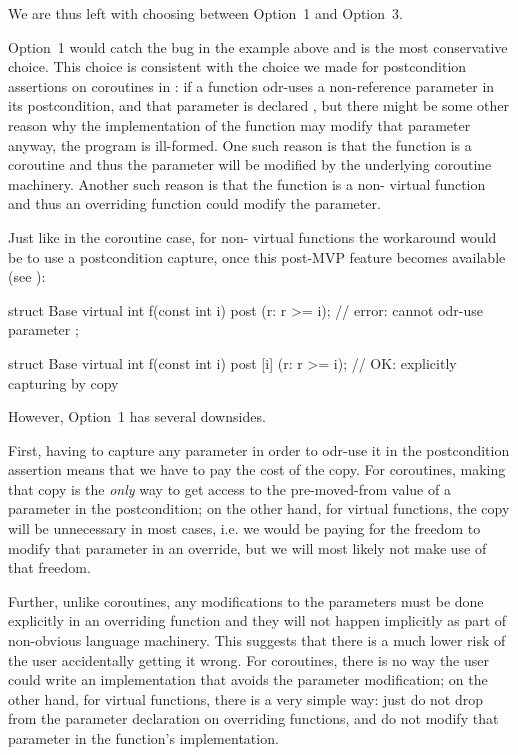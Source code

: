 We are thus left with choosing between Option~1 and Option~3.

Option~1 would catch the bug in the example above and is the most conservative choice. This choice is consistent with the choice we made for postcondition assertions on coroutines in \cite{P2900R10}: if a function odr-uses a non-reference parameter in its postcondition, and that parameter is declared , but there might be some other reason why the implementation of the function may modify that parameter anyway, the program is ill-formed. One such reason is that the function is a coroutine and thus the parameter will be modified by the underlying coroutine machinery. Another such reason is that the function is a non- virtual function and thus an overriding function could modify the parameter.

Just like in the coroutine case, for non- virtual functions the workaround would be to use a postcondition capture, once this post-MVP feature becomes available (see \cite{P3098R0}):
\begin{codeblock}
struct Base {
  virtual int f(const int i) post (r: r >= i);     // error: cannot odr-use parameter  
};

struct Base {
  virtual int f(const int i) post [i] (r: r >= i); // OK: explicitly capturing  by copy
}
\end{codeblock}

However, Option~1 has several downsides.

First, having to capture any parameter in order to odr-use it in the postcondition assertion means that we have to pay the cost of the copy. For coroutines, making that copy is the \emph{only} way to get access to the pre-moved-from value of a parameter in the postcondition; on the other hand, for virtual functions, the copy will be unnecessary in most cases, i.e. we would be paying for the freedom to modify that parameter in an override, but we will most likely not make use of that freedom.

Further, unlike coroutines, any modifications to the parameters must be done explicitly in an overriding function and they will not happen implicitly as part of non-obvious language machinery. This suggests that there is a much lower risk of the user accidentally getting it wrong. For coroutines, there is no way the user could write an implementation that avoids the parameter modification; on the other hand, for virtual functions, there is a very simple way: just do not drop  from the parameter declaration on overriding functions, and do not modify that parameter in the function's implementation. 

